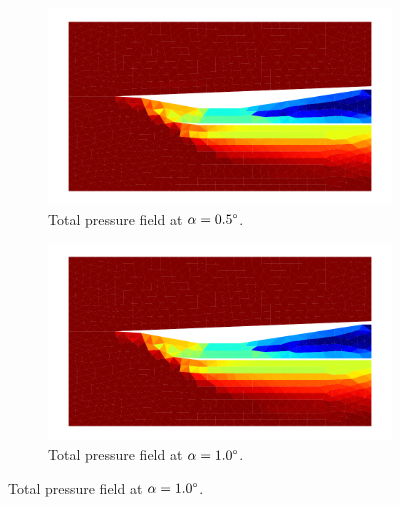 \pagebreak
\begin{figure}[h]
    \centering
    \begin{subfigure}[h]{0.48\linewidth}
        \centering
        \includegraphics[width=\linewidth]{rep/q5/pt_a5.pdf}
        \caption{Total pressure field at $\alpha=0.5\degree$.}
    \end{subfigure}
    \begin{subfigure}[h]{0.48\linewidth}
        \centering
        \includegraphics[width=\linewidth]{rep/q5/pt_a10.pdf}
        \caption{Total pressure field at $\alpha=1.0\degree$.}
    \end{subfigure}


\end{figure}
